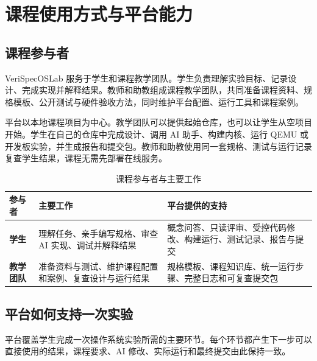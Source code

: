 \chapter{课程使用方式与平台能力}

\section{课程参与者}

VeriSpecOSLab 服务于学生和课程教学团队。学生负责理解实验目标、记录设计、完成实现并解释结果。教师和助教组成课程教学团队，共同准备课程资料、规格模板、公开测试与硬件验收方法，同时维护平台配置、运行工具和课程案例。

平台以本地课程项目为中心。教学团队可以提供起始仓库，也可以让学生从空项目开始。学生在自己的仓库中完成设计、调用 AI 助手、构建内核、运行 QEMU 或开发板实验，并生成报告和提交包。教师和助教使用同一套规格、测试与运行记录复查学生结果，课程无需先部署在线服务。

\begin{table}[htbp]
  \centering
  \caption{课程参与者与主要工作}
  \begin{tabularx}{\textwidth}{>{\bfseries}p{2.8cm} X X}
    \toprule
    参与者 & 主要工作 & 平台提供的支持 \\
    \midrule
    学生 & 理解任务、亲手编写规格、审查 AI 实现、调试并解释结果 & 概念问答、只读评审、受控代码修改、构建运行、测试记录、报告与提交 \\
    教学团队 & 准备资料与测试、维护课程配置和案例、复查设计与运行结果 & 规格模板、课程知识库、统一运行步骤、完整日志和可复查提交包 \\
    \bottomrule
  \end{tabularx}
\end{table}

\section{平台如何支持一次实验}

平台覆盖学生完成一次操作系统实验所需的主要环节。每个环节都产生下一步可以直接使用的结果，课程要求、AI 修改、实际运行和最终提交由此保持一致。

